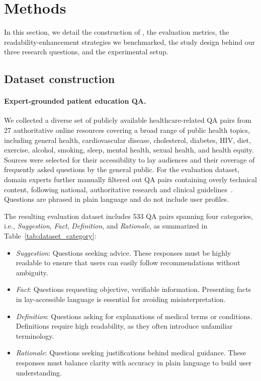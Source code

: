 \section{Methods}\label{sec:methods}

In this section, we detail the construction of \repqa, the evaluation metrics, the readability-enhancement strategies we benchmarked, the study design behind our three research questions, and the experimental setup.

\subsection{Dataset construction}\label{sec:dataset_curation}

\paragraph{Expert-grounded patient education QA.}
We collected a diverse set of publicly available healthcare-related QA pairs from 27 authoritative online resources covering a broad range of public health topics, including general health, cardiovascular disease, cholesterol, diabetes, HIV, diet, exercise, alcohol, smoking, sleep, mental health, sexual health, and health equity.
Sources were selected for their accessibility to lay audiences and their coverage of frequently asked questions by the general public.
For the evaluation dataset, domain experts further manually filtered out QA pairs containing overly technical content, following national, authoritative research and clinical guidelines~\citep{doody2016nursing,chiang2016guidance,corry2013developing}.
Questions are phrased in plain language and do not include user profiles.

The resulting evaluation dataset includes 533 QA pairs spanning four categories, i.e., \textit{Suggestion}, \textit{Fact}, \textit{Definition}, and \textit{Rationale}, as summarized in Table~\ref{tab:dataset_category}:
\begin{itemize}[leftmargin=*]
\item \textit{Suggestion}: Questions seeking advice. These responses must be highly readable to ensure that users can easily follow recommendations without ambiguity.

\item \textit{Fact}: Questions requesting objective, verifiable information. Presenting facts in lay-accessible language is essential for avoiding misinterpretation.

\item \textit{Definition}: Questions asking for explanations of medical terms or conditions. Definitions require high readability, as they often introduce unfamiliar terminology.

\item \textit{Rationale}: Questions seeking justifications behind medical guidance. These responses must balance clarity with accuracy in plain language to build user understanding.
\end{itemize}

